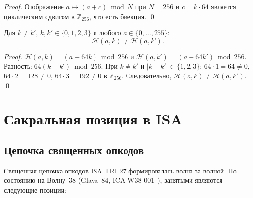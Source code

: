 \begin{proof}
Отображение $a \mapsto (a + c) \bmod N$ при $N = 256$ и $c = k \cdot 64$
является циклическим сдвигом в $\mathbb{Z}_{256}$,
что есть биекция.  \qed
\end{proof}

\begin{proposition}
\label{prop:channel-exclusivity}
Для $k \neq k'$, $k, k' \in \{0,1,2,3\}$ и любого
$a \in \{0,\ldots,255\}$:
\[
  \mathcal{H}(a, k) \neq \mathcal{H}(a, k').
\]
\end{proposition}

\begin{proof}
$\mathcal{H}(a, k) = (a + 64k) \bmod 256$ и
$\mathcal{H}(a, k') = (a + 64k') \bmod 256$.
Разность: $64(k - k') \bmod 256$.
При $k \neq k'$ и $|k - k'| \in \{1, 2, 3\}$:
$64 \cdot 1 = 64 \neq 0$,
$64 \cdot 2 = 128 \neq 0$,
$64 \cdot 3 = 192 \neq 0$ в $\mathbb{Z}_{256}$.
Следовательно, $\mathcal{H}(a, k) \neq \mathcal{H}(a, k')$.
\qed
\end{proof}

\section{Сакральная позиция в ISA}
\label{sec:glava85-sacred-isa}

\subsection{Цепочка священных опкодов}
\label{subsec:glava85-opcode-chain}

Священная цепочка опкодов ISA TRI-27 формировалась волна за волной.
По состоянию на Волну~38 (Glava~84, ICA-W38-001~\cite{trios871}),
занятыми являются следующие позиции:

